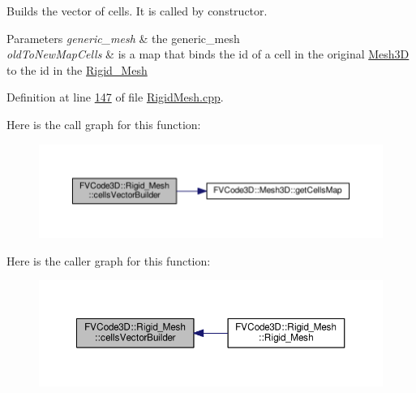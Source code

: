 Builds the vector of cells. It is called by constructor. 


\begin{DoxyParams}{Parameters}
{\em generic\+\_\+mesh} & the generic\+\_\+mesh \\
\hline
{\em old\+To\+New\+Map\+Cells} & is a map that binds the id of a cell in the original \hyperlink{classFVCode3D_1_1Mesh3D}{Mesh3D} to the id in the \hyperlink{classFVCode3D_1_1Rigid__Mesh}{Rigid\+\_\+\+Mesh} \\
\hline
\end{DoxyParams}


Definition at line \hyperlink{RigidMesh_8cpp_source_l00147}{147} of file \hyperlink{RigidMesh_8cpp_source}{Rigid\+Mesh.\+cpp}.



Here is the call graph for this function\+:
\nopagebreak
\begin{figure}[H]
\begin{center}
\leavevmode
\includegraphics[width=350pt]{classFVCode3D_1_1Rigid__Mesh_a3ddbd3589db60840edbbd76d4a69ec0a_cgraph}
\end{center}
\end{figure}




Here is the caller graph for this function\+:
\nopagebreak
\begin{figure}[H]
\begin{center}
\leavevmode
\includegraphics[width=350pt]{classFVCode3D_1_1Rigid__Mesh_a3ddbd3589db60840edbbd76d4a69ec0a_icgraph}
\end{center}
\end{figure}


